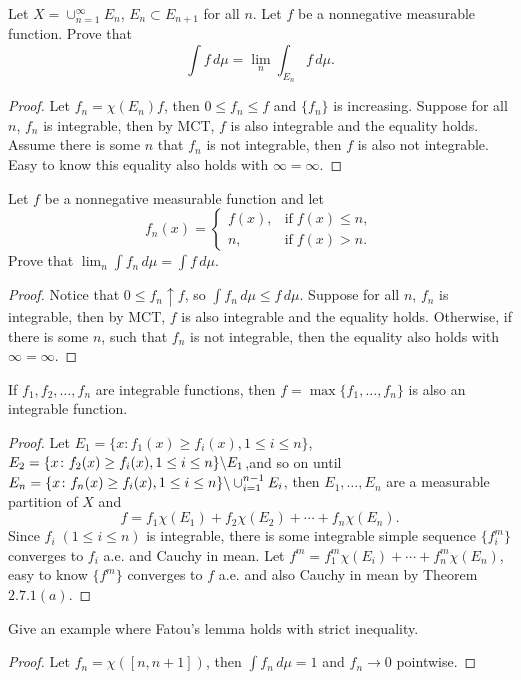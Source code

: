 \begin{pro}%
	Let $X=\cup_{n=1}^\infty E_n$, $E_n\subset E_{n+1}$ for all $n$. Let $f$ be a nonnegative measurable function. Prove that
	\[\int f\,d\mu=\lim_n \int_{E_n} f\,d\mu.\]
\end{pro}
\begin{proof}
	Let $f_n=\chi(E_n)f$, then $0\leq f_n\leq f$ and $\{f_n\}$ is increasing. Suppose for all $n$, $f_n$ is integrable, then by MCT, $f$ is also integrable and the equality holds. Assume there is some $n$ that $f_n$ is not integrable, then $f$ is also not integrable. Easy to know this equality also holds with $\infty=\infty$.
\end{proof}

\begin{pro}%
	Let $f$ be a nonnegative measurable function and let
	\[f_n(x)=\begin{cases}f(x),&\mbox{if}\;f(x)\leq n,\\
	n,&\mbox{if}\;f(x)>n.\end{cases}\]
	Prove that $\lim_n\int f_n\,d\mu=\int f\,d\mu$.
\end{pro}
\begin{proof}
	Notice that $0\leq f_n\uparrow f$, so $\int f_n\,d\mu\leq f\,d\mu$. Suppose for all $n$, $f_n$ is integrable, then by MCT, $f$ is also integrable and the equality holds. Otherwise, if there is some $n$, such that $f_n$ is not integrable, then the equality also holds with $\infty=\infty$.
\end{proof}

\begin{pro}%
	If $f_1,f_2,\ldots,f_n$ are integrable functions, then $f=\max\{f_1,\ldots,f_n\}$ is also an integrable function.
\end{pro}
\begin{proof}
	Let $E_1=\{x\colon f_1(x)\geq f_i(x),1\leq i\leq n\}$, $E_2=\{x\colon f_2(x)\geq f_i(x),1\leq i\leq n\}\backslash E_1$,and so on until $E_n=\{x\colon f_n(x)\geq f_i(x),1\leq i\leq n\}\backslash\cup_{i=1}^{n-1} E_i$, then $E_1,\ldots,E_n$ are a measurable partition of $X$ and
	\[f=f_1\chi(E_1)+f_2\chi(E_2)+\cdots+f_n\chi(E_n).\]
	Since $f_i\;(1\leq i\leq n)$ is integrable, there is some integrable simple sequence $\{f_i^m\}$ converges to $f_i$ a.e. and Cauchy in mean.
	Let $f^m=f_1^m \chi(E_i)+\cdots+f_n^m\chi(E_n)$, easy to know $\{f^m\}$ converges to $f$ a.e. and also Cauchy in mean by Theorem $2.7.1(a)$.
\end{proof}

\begin{pro}%
	Give an example where Fatou's lemma holds with strict inequality.
\end{pro}
\begin{proof}
	Let $f_n=\chi([n,n+1])$, then $\int f_n\,d\mu=1$ and $f_n\to 0$ pointwise.
\end{proof}

